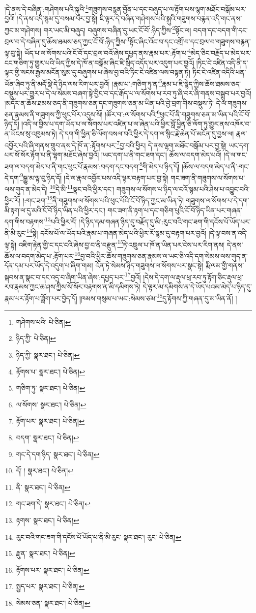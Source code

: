 །དེ་ནས་དེ་བཞིན་:གཤེགས་པའི་སྐུའི་\footnote{གཤེགས་པའི་  པེ་ཅིན། }གཟུགས་བརྙན་བྱོན་པ་དང་བཞུད་པ་ལ་རྟོག་པས་ལྷག་མཐོང་བསྒོམ་པར་བྱའོ། །དེ་ནས་འདི་སྙམ་དུ་བསམ་པར་བྱ་སྟེ། ཇི་ལྟར་དེ་བཞིན་གཤེགས་པའི་སྐུའི་གཟུགས་བརྙན་འདི་གང་ནས་ཀྱང་མ་གཤེགས། གར་ཡང་མི་བཞུད། བཞུགས་བཞིན་དུ་ཡང་ངོ་བོ་:ཉིད་ཀྱིས་\footnote{ཉིད་ཀྱི་  པེ་ཅིན། }སྟོང་ལ། བདག་དང་བདག་གི་དང་བྲལ་བ་དེ་བཞིན་དུ་ཆོས་ཐམས་ཅད་ཀྱང་ངོ་བོ་:ཉིད་ཀྱིས་\footnote{ཉིད་ཀྱི་  སྣར་ཐང་།  པེ་ཅིན། }སྟོང་ཞིང་འོང་བ་དང་འགྲོ་བ་དང་བྲལ་བ་གཟུགས་བརྙན་ལྟ་བུ་སྟེ། ཡོད་པ་ལ་སོགས་པའི་ངོ་བོ་དང་བྲལ་བའོ་ཞེས་དཔྱད་ནས་རྣམ་པར་:རྟོག་པ་\footnote{རྟོགས་པ་  སྣར་ཐང་།  པེ་ཅིན། }མེད་ཅིང་བརྗོད་པ་མེད་པར་ངང་གཅིག་ཏུ་གྱུར་པའི་ཡིད་ཀྱིས་དེ་ཁོ་ན་བསྒོམ་ཞིང་ཇི་སྲིད་འདོད་པར་འདུག་པར་བྱའོ། །ཏིང་ངེ་འཛིན་འདི་ནི་ད་ལྟར་གྱི་སངས་རྒྱས་མངོན་སུམ་དུ་བཞུགས་པ་ཞེས་བྱ་བའི་ཏིང་ངེ་འཛིན་ལས་བསྟན་ཏེ། ཏིང་ངེ་འཛིན་འདིའི་ཕན་ཡོན་ཞིབ་ཏུ་ནི་མདོ་སྡེ་དེ་ཉིད་ལས་རིག་པར་བྱའོ། །རྣམ་པ་:གཅིག་ཏུ་ན་\footnote{གཅིག་ཏུ་  སྣར་ཐང་།  པེ་ཅིན། }རྣམ་པ་ཇི་སྙེད་ཀྱིས་ཆོས་ཐམས་ཅད་བསྡུས་པར་གྱུར་པ་དེ་ལ་སེམས་བཞག་སྟེ་བྱིང་བ་དང་རྒོད་པ་ལ་སོགས་པ་རབ་ཏུ་ཞི་བར་ཞི་གནས་བསྒྲུབ་པར་བྱའོ། །མདོར་ན་ཆོས་ཐམས་ཅད་ནི་གཟུགས་ཅན་དང་གཟུགས་ཅན་མ་ཡིན་པའི་བྱེ་བྲག་གིས་བསྡུས་ཏེ། དེ་ལ་གཟུགས་ཅན་རྣམས་ནི་གཟུགས་ཀྱི་ཕུང་པོར་འདུས་སོ། །ཚོར་བ་:ལ་སོགས་པའི་\footnote{ལ་སོགས་  སྣར་ཐང་།  པེ་ཅིན། }ཕུང་པོ་ནི་གཟུགས་ཅན་མ་ཡིན་པའི་ངོ་བོ་ཉིད་དོ། །འདི་ལ་བྱིས་པ་དག་ཡོད་པ་ལ་སོགས་པར་འཛིན་པ་ལ་ཞེན་པའི་ཕྱིར་བློ་ཕྱིན་ཅི་ལོག་ཏུ་གྱུར་ནས་འཁོར་བ་ན་ཡོངས་སུ་འཁྱམས་ཏེ། དེ་དག་གི་ཕྱིན་ཅི་ལོག་བསལ་བའི་ཕྱིར་དེ་དག་ལ་སྙིང་རྗེ་ཆེན་པོ་མངོན་དུ་བྱས་ལ། རྣལ་འབྱོར་པའི་ཞི་གནས་གྲུབ་ནས་དེ་ཁོ་ན་:རྟོགས་པར་\footnote{རྟོག་པར་  སྣར་ཐང་།  པེ་ཅིན། }བྱ་བའི་ཕྱིར། དེ་ནས་ལྷག་མཐོང་བསྒོམ་པར་བྱ་སྟེ། ཡང་དག་པར་སོ་སོར་རྟོག་པ་ནི་ལྷག་མཐོང་ཞེས་བྱའོ། །ཡང་དག་པ་ནི་གང་ཟག་དང་། ཆོས་ལ་བདག་མེད་པའོ། །དེ་ལ་གང་ཟག་ལ་བདག་མེད་པ་ནི་གང་ཕུང་པོ་རྣམས་:བདག་དང་བདག་\footnote{བདག་  སྣར་ཐང་།  པེ་ཅིན། }གི་མེད་པ་ཉིད་དོ། །ཆོས་ལ་བདག་མེད་པ་ནི་:གང་དེ་དག་\footnote{གང་དེ་དག་ཉིད་  སྣར་ཐང་།  པེ་ཅིན། }སྒྱུ་མ་ལྟ་བུ་ཉིད་དོ། །དེ་ལ་རྣལ་འབྱོར་པས་འདི་ལྟར་བརྟག་པར་བྱ་སྟེ། གང་ཟག་ནི་གཟུགས་ལ་སོགས་པ་ལས་གུད་ན་མེད་དེ། \footnote{དོ། །  སྣར་ཐང་།  པེ་ཅིན། }དེ་མི་\footnote{ནི་  སྣར་ཐང་།  པེ་ཅིན། }སྣང་བའི་ཕྱིར་དང་། གཟུགས་ལ་སོགས་པ་ཉིད་ལ་ངའོ་སྙམ་པའི་ཤེས་པ་འབྱུང་བའི་ཕྱིར་རོ། །:གང་ཟག་\footnote{གང་ཟག་དེ་  སྣར་ཐང་།  པེ་ཅིན། }ནི་གཟུགས་ལ་སོགས་པའི་ཕུང་པོའི་ངོ་བོ་ཉིད་ཀྱང་མ་ཡིན་ཏེ། གཟུགས་ལ་སོགས་པ་དེ་དག་མི་རྟག་ལ་དུ་མའི་ངོ་བོ་ཉིད་ཡིན་པའི་ཕྱིར་དང་། གང་ཟག་ནི་རྟག་པ་དང་གཅིག་པུའི་ངོ་བོ་ཉིད་ཡིན་པར་གཞན་དག་གིས་བརྟགས་\footnote{རྟགས་  སྣར་ཐང་།  པེ་ཅིན། }པའི་ཕྱིར་རོ། །དེ་ཉིད་དམ་གཞན་ཉིད་དུ་བརྗོད་དུ་མི་:རུང་བའི་གང་ཟག་གི་དངོས་པོ་ཡོད་པར་ནི་མི་རུང་\footnote{རུང་བའི་གང་ཟག་གི་དངོས་པོ་ཡོད་པ་ནི་མི་རུང་  སྣར་ཐང་། རུང་  པེ་ཅིན། }སྟེ། དངོས་པོ་ལ་ཡོད་པའི་རྣམ་པ་གཞན་མེད་པའི་ཕྱིར་རོ་སྙམ་དུ་བརྟག་པར་བྱའོ། །དེ་ལྟ་བས་ན་འདི་ལྟ་སྟེ། འཇིག་རྟེན་གྱི་ང་དང་ངའི་ཞེས་བྱ་བ་ནི་བརྫུན་\footnote{རྫུན་  སྣར་ཐང་།  པེ་ཅིན། }ཏེ་འཁྲུལ་པ་ཁོ་ན་ཡིན་པར་ངེས་པར་རིག་ནས། དེ་ནས་ཆོས་ལ་བདག་མེད་པ་:རྟོག་པར་\footnote{རྟོགས་པར་  སྣར་ཐང་།  པེ་ཅིན། }བྱ་བའི་ཕྱིར་ཆོས་གཟུགས་ཅན་རྣམས་ལ་ཡང་ཅི་འདི་དག་སེམས་ལས་གུད་ན་དོན་དམ་པར་ཡོད་དེ་འདུག་པ་ཞིག་གམ། འོན་ཏེ་སེམས་ཉིད་གཟུགས་ལ་སོགས་པར་སྣང་སྟེ། རྨི་ལམ་གྱི་གནས་སྐབས་ན་སྣང་བ་དང་འདྲ་བ་ཞིག་ཡིན་ཞེས་:དཔྱད་པར་\footnote{སྤྱད་པར་  སྣར་ཐང་།  པེ་ཅིན། }བྱའོ། །དེས་དེ་དག་ལ་རྡུལ་ཕྲ་རབ་ཏུ་རྟོག་ཅིང་རྡུལ་ཕྲ་རབ་རྣམས་ཀྱང་ཆ་ཤས་ཀྱིས་སོ་སོར་བརྟགས་ན་མི་དམིགས་ཏེ། དེ་ལྟར་མ་དམིགས་ན་དེ་ཡོད་པའམ་མེད་པ་ཉིད་དུ་རྣམ་པར་རྟོག་པ་ཟློག་པར་བྱེད་དོ། །ཁམས་གསུམ་པ་ཡང་:སེམས་ཙམ་\footnote{སེམས་ཅན་  སྣར་ཐང་།  པེ་ཅིན། }དུ་རྟོགས་ཀྱི་གཞན་དུ་མ་ཡིན་ནོ། །
